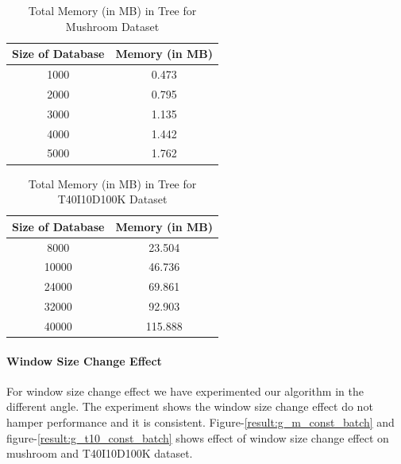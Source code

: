 \documentclass[conference]{IEEEtran}
\begin{document}
    \begin{table}[h]
        \centering
        \begin{tabular}{|c|c|}
        \hline 
       Size of Database        &    Memory (in MB)\\    \hline\hline
        
        1000&0.473\\\hline
        2000&0.795\\\hline
        3000&1.135\\\hline
        4000&1.442\\\hline
        5000&1.762\\\hline
    
            \end{tabular}
        \caption{ Total Memory (in MB) in Tree for Mushroom Dataset}
        \label{result:g_m_const_tran_mem}
        \end{table}
    
    \begin{table}[h]
        \centering
        \begin{tabular}{|c|c|}
        \hline 
       Size of Database       &    Memory (in MB)\\    \hline\hline
        
        8000 &23.504\\\hline
        10000&46.736\\\hline
        24000&69.861\\\hline
        32000&92.903\\\hline
        40000&115.888\\\hline
    
            \end{tabular}
        \caption{ Total Memory (in MB) in Tree for T40I10D100K Dataset}
        \label{result:g_t10_const_tran_mem}
        \end{table}

\paragraph{Window Size Change Effect}For window size change effect we have experimented our algorithm in the different angle. The experiment shows the window size change effect do not hamper performance and it is consistent. Figure-\ref{result:g_m_const_batch} and figure-\ref{result:g_t10_const_batch} shows effect of window size change effect on mushroom and T40I10D100K dataset.
\end{document}
